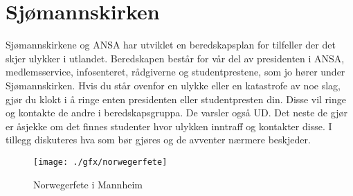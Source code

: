\section{Sjømannskirken}
Sjømannskirkene og ANSA har utviklet en beredskapsplan for tilfeller der det skjer ulykker i utlandet. Beredskapen består for vår del av presidenten i ANSA, medlemsservice, infosenteret, rådgiverne og studentprestene, som jo hører under Sjømannskirken. Hvis du står ovenfor en ulykke eller en katastrofe av noe slag, gjør du klokt i å ringe enten presidenten eller studentpresten din. Disse vil ringe og kontakte de andre i beredskapsgruppa. De varsler også UD. Det neste de gjør er åsjekke om det finnes studenter hvor ulykken inntraff og kontakter disse. I tillegg diskuteres hva som bør gjøres og de avventer nærmere beskjeder.

\begin{figure}[h]
\center
\texttt{[image: ./gfx/norwegerfete]}
\caption{Norwegerfete i Mannheim}
\end{figure}
